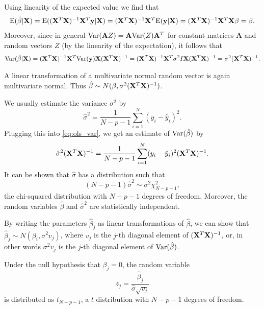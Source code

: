 Using linearity of the expected value we find that
\begin{align*}
    \mathrm{E}(\hat{\beta}|\mathbf{X})=\mathrm{E}((\mathbf{X}^T\mathbf{X})^{-1}\mathbf{X}^T\mathbf{y}|\mathbf{X})=(\mathbf{X}^T\mathbf{X})^{-1}\mathbf{X}^T\mathrm{E}(\mathbf{y}|\mathbf{X}) = (\mathbf{X}^T\mathbf{X})^{-1}\mathbf{X}^T\mathbf{X}\beta = \beta.
\end{align*}
Moreover, since in general $\mathrm{Var}(\mathbf{A}Z)=\mathbf{A}\mathrm{Var}(Z)\mathbf{A}^T$ for constant matrices $\mathbf{A}$ and random vectors $Z$ (by the linearity of the expectation), it follows that
\begin{align}\label{eq:ols_var}
    \mathrm{Var}(\hat{\beta}|\mathbf{X}) = (\mathbf{X}^T\mathbf{X})^{-1}\mathbf{X}^T\mathrm{Var}(\mathbf{y})\mathbf{X}(\mathbf{X}^T\mathbf{X})^{-1} = (\mathbf{X}^T\mathbf{X})^{-1}\mathbf{X}^T\sigma^2I\mathbf{X}(\mathbf{X}^T\mathbf{X})^{-1} = \sigma^2(\mathbf{X}^T\mathbf{X})^{-1}.
\end{align}

A linear transformation of a multivariate normal random vector is again multivariate normal. Thus $\hat{\beta}\sim N(\beta,\sigma^2(\mathbf{X}^T\mathbf{X})^{-1})$.

We usually estimate the variance $\sigma^2$ by
\begin{equation*}
    \hat{\sigma}^2=\frac{1}{N-p-1}\sum_{i=1}^N(y_i-\hat{y}_i)^2.
\end{equation*}
Plugging this into \cref{eq:ols_var}, we get an estimate of $\mathrm{Var}(\hat{\beta})$ by
\begin{equation}\label{eq:ols_var_est}
    \hat{\sigma}^2(\mathbf{X}^T\mathbf{X})^{-1}=\frac{1}{N-p-1}\sum_{i=1}^N(y_i-\hat{y}_i)^2(\mathbf{X}^T\mathbf{X})^{-1}.
\end{equation}
It can be shown that $\hat{\sigma}$ has a distribution such that
\begin{equation*}
    (N-p-1)\hat{\sigma}^2\sim\sigma^2\chi^2_{N-p-1},
\end{equation*}
the chi-squared distribution with $N-p-1$ degrees of freedom.\cite[47]{ESL} Moreover, the random variables $\hat{\beta}$ and $\hat{\sigma}^2$ are statistically independent.

By writing the parameters $\hat{\beta}_j$ as linear transformations of $\hat{\beta}$, we can show that $\hat{\beta}_j\sim N(\beta_i,\sigma^2 v_j)$, where $v_j$ is the $j$-th diagonal element of $(\mathbf{X}^T\mathbf{X})^{-1}$, or, in other words $\sigma^2 v_j$ is the $j$-th diagonal element of $\mathrm{Var}(\hat{\beta})$.

Under the null hypothesis that $\beta_j = 0$, the random variable
\begin{equation*}
    z_j=\frac{\hat{\beta}_j}{\hat{\sigma}\sqrt{v_j}}
\end{equation*}
is distributed as $t_{N-p-1}$, a $t$ distribution with $N-p-1$ degrees of freedom.

